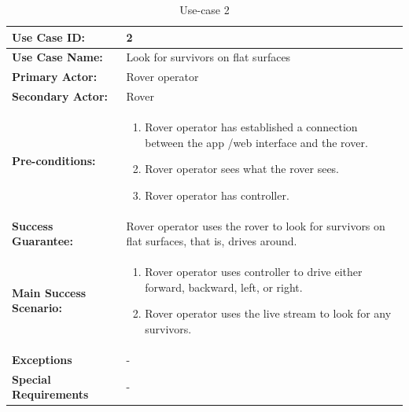 \documentclass[12pt]{article}
\begin{document}
	 	\begin{table}[H]
	 		\centering
	 		\begin{tabularx}{\linewidth}{|X|X|}
	 			\hline
	 			\textbf{Use Case ID:} &2\\
	 			\hline
	 			\textbf{Use Case Name:} &Look for survivors on flat surfaces\\
	 			\hline
	 			\textbf{Primary Actor:} &Rover operator\\
	 			\hline
	 			\textbf{Secondary Actor:} &Rover\\
	 			\hline
	 			\textbf{Pre-conditions:} &\begin{enumerate}
	 				\item Rover operator has established a connection between the app /web interface and the rover.
	 				\item Rover operator sees what the rover sees.
	 				\item Rover operator has controller.
	 			\end{enumerate}\\
	 			\hline
	 			\textbf{Success Guarantee:} &
	 			Rover operator uses the rover to look for survivors on flat surfaces, that is, drives around. \\
	 			\hline 
	 			\textbf{Main Success Scenario:} &\begin{enumerate}
	 				\item Rover operator uses controller to drive either forward, backward, left, or right.
	 				\item Rover operator uses the live stream to look for any survivors.
	 			\end{enumerate}\\
	 			\hline
	 			\textbf{Exceptions} &-\\
	 			\hline
	 			\textbf{Special Requirements} &-\\
	 			\hline
	 		\end{tabularx}
	 		\caption{Use-case 2}
	 		\label{table:Use-case2}   
	 	\end{table}
\end{document}
